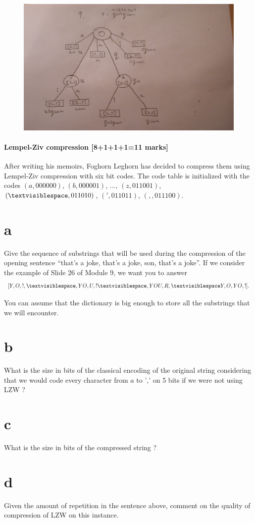 \documentclass[12pt]{article}
\newcommand{\vs}{\textvisiblespace}
\begin{document}
\begin{figure}[ht!]
\centering
\includegraphics[width=170mm]{9.jpg}
\label{overflow}
\end{figure}

\subsection{Lempel-Ziv compression [8+1+1+1=11 marks]} 
After writing his memoirs, Foghorn Leghorn has decided to compress them 
using Lempel-Ziv compression with six bit codes. 
The code table is initialized with the codes 
$(a,000000)$, $(b,000001)$, $\dots$, $(z,011001)$, $({\vs},011010)$, 
$(',011011)$, $(, ,011100)$.
\begin{enumerate}
\part{a}Give the sequence of substrings that will be used during the compression 
of the opening sentence ``that's a joke, that's a joke, son, that's a joke''.
If we consider the example of Slide 26 of Module 9, we want you to answer 
$$[Y,O,!,{\vs},YO,U,!{\vs},YOU,R,{\vs}Y,O,YO,!].$$

You can assume that the dictionary is big enough to store 
all the substrings that we will encounter.

\part{b} What is the size in bits of the classical encoding of the original string considering that we would code every character from $a$ to ',' on 5 bits if we were not using LZW  ? 

\part{c} What is the size in bits of the compressed string ?

\part{d} Given the amount of repetition in the sentence above, comment on the quality of compression of LZW on this instance.

\end{enumerate}
\end{document}
